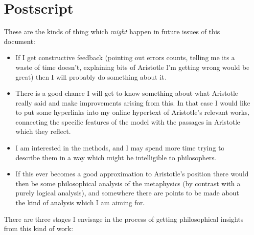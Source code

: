 
\section{Postscript}\label{POSTSCRIPT}

These are the kinds of thing which {\it might} happen in future issues of this document:

\begin{itemize}
\item If I get constructive feedback (pointing out errors counts, telling me its a waste of time doesn't, explaining bits of Aristotle I'm getting wrong would be great) then I will probably do something about it.

\item There is a good chance I will get to know something about what Aristotle really said and make improvements arising from this.
In that case I would like to put some hyperlinks into my online hypertext of Aristotle's relevant works, connecting the specific features of the model with the passages in Aristotle which they reflect.

\item I am interested in the methods, and I may spend more time trying to describe them in a way which might be intelligible to philosophers.

\item If this ever becomes a good approximation to Aristotle's position there would then be some philosophical analysis of the metaphysics (by contrast with a purely logical analysis), and somewhere there are points to be made about the kind of analysis which I am aiming for.
\end{itemize}

There are three stages I envisage in the process of getting philosophical insights from this kind of work:

